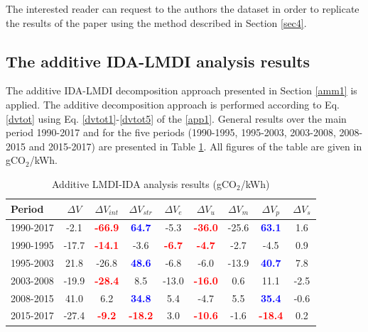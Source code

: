 \documentclass[energies,article,accept,moreauthors,12pt,a4paper]{mdpi} %
\begin{document}
 The interested reader can request to the authors the dataset in order to replicate the results of the paper using the method described in Section \ref{sec4}.   

 \subsection{The additive IDA-LMDI analysis results} \label{addres}

 The additive IDA-LMDI decomposition approach presented in Section \ref{amm1} is applied. The  additive decomposition approach is performed according to Eq. \ref{dvtot} using Eq. \ref{dvtot1}-\ref{dvtot5} of the  \ref{app1}. General results over the main period 1990-2017 and for the five periods (1990-1995, 1995-2003, 2003-2008, 2008-2015 and 2015-2017) are presented in Table \ref{table1}. All figures of the table are given in gCO$_2$/kWh.
 

\begin{table}[!h]\label{11}										
\begin{center}\caption{Additive LMDI-IDA analysis results (gCO$_2$/kWh)}			
\begin{tabular}{l|c|cc|ccc|cc}\hline	
Period	 &$	\Delta V	$&$	\Delta V_{int}	$&$	\Delta V_{str}$	&$	\Delta V_e	$&$	\Delta V_{u}	$&$	\Delta V_{m}	$&$	\Delta V_{p}	$&$	\Delta V_{s}	$		\\\hline
1990-2017	&	-2.1	&\textcolor{red}{\textbf{	-66.9	}}&\textcolor{blue}{\textbf{	64.7	}}&	-5.3	&\textcolor{red}{\textbf{	-36.0	}}&	-25.6	&\textcolor{blue}{\textbf{	63.1	}}&	1.6	 	\\\hline
1990-1995	&	-17.7	&\textcolor{red}{\textbf{	-14.1	}}&	-3.6	&\textcolor{red}{\textbf{	-6.7	}}&\textcolor{red}{\textbf{	-4.7	}}&	-2.7	&	-4.5	&	0.9	 \\
1995-2003	&	21.8	&	-26.8	&\textcolor{blue}{\textbf{	48.6	}}&	-6.8	&	-6.0	&	-13.9	&\textcolor{blue}{\textbf{	40.7	}}&	7.8	 \\
2003-2008	&	-19.9	&\textcolor{red}{\textbf{	-28.4	}}&	8.5	&	-13.0	&\textcolor{red}{\textbf{	-16.0	}}&	0.6	&	11.1	&	-2.5	 \\
2008-2015	&	41.0	&	6.2	&\textcolor{blue}{\textbf{	34.8	}}&	5.4	&	-4.7	&	5.5	&\textcolor{blue}{\textbf{	35.4	}}&	-0.6	 \\
2015-2017	&	-27.4	&\textcolor{red}{\textbf{	-9.2	}}&\textcolor{red}{\textbf{	-18.2	}}&	3.0	&\textcolor{red}{\textbf{	-10.6	}}&	-1.6	&\textcolor{red}{\textbf{	-18.4	}}&	0.2 \\\hline
\end{tabular}\label{table1}										
\end{center}										
\end{table}	
\end{document}
